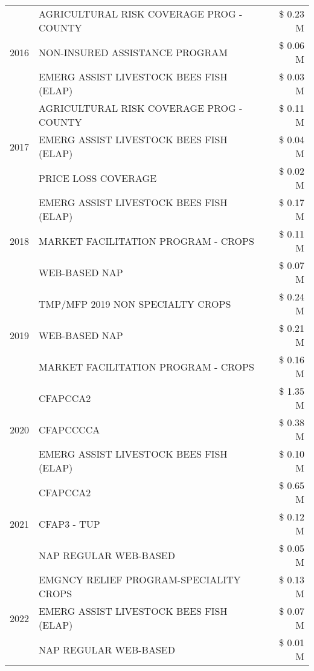 \begin{tabular}{llr}
\multirow[t]{3}{*}{2016} & AGRICULTURAL RISK COVERAGE PROG - COUNTY & \$ 0.23 M \\
 & NON-INSURED ASSISTANCE PROGRAM & \$ 0.06 M \\
 & EMERG ASSIST LIVESTOCK BEES FISH (ELAP) & \$ 0.03 M \\
\cline{1-3}
\multirow[t]{3}{*}{2017} & AGRICULTURAL RISK COVERAGE PROG - COUNTY & \$ 0.11 M \\
 & EMERG ASSIST LIVESTOCK BEES FISH (ELAP) & \$ 0.04 M \\
 & PRICE LOSS COVERAGE & \$ 0.02 M \\
\cline{1-3}
\multirow[t]{3}{*}{2018} & EMERG ASSIST LIVESTOCK BEES FISH (ELAP) & \$ 0.17 M \\
 & MARKET FACILITATION PROGRAM - CROPS & \$ 0.11 M \\
 & WEB-BASED NAP & \$ 0.07 M \\
\cline{1-3}
\multirow[t]{3}{*}{2019} & TMP/MFP 2019 NON SPECIALTY CROPS & \$ 0.24 M \\
 & WEB-BASED NAP & \$ 0.21 M \\
 & MARKET FACILITATION PROGRAM - CROPS & \$ 0.16 M \\
\cline{1-3}
\multirow[t]{3}{*}{2020} & CFAPCCA2 & \$ 1.35 M \\
 & CFAPCCCCA & \$ 0.38 M \\
 & EMERG ASSIST LIVESTOCK BEES FISH (ELAP) & \$ 0.10 M \\
\cline{1-3}
\multirow[t]{3}{*}{2021} & CFAPCCA2 & \$ 0.65 M \\
 & CFAP3 - TUP & \$ 0.12 M \\
 & NAP REGULAR WEB-BASED & \$ 0.05 M \\
\cline{1-3}
\multirow[t]{3}{*}{2022} & EMGNCY RELIEF PROGRAM-SPECIALITY CROPS & \$ 0.13 M \\
 & EMERG ASSIST LIVESTOCK BEES FISH (ELAP) & \$ 0.07 M \\
 & NAP REGULAR WEB-BASED & \$ 0.01 M \\
\cline{1-3}
\bottomrule
\end{tabular}
